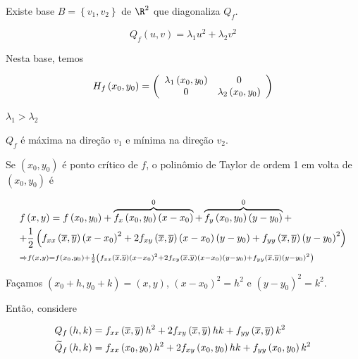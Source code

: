 \documentclass[11pt, oneside, a4paper]{gsm-l}
\begin{document}
Existe base $B = \left\{ {v_1 ,v_2 } \right\}$ de $\R^2$ que diagonaliza $Q_f$.

\[
Q_f \left( {u,v} \right) = \lambda _1 u^2  + \lambda _2 v^2
\]

Nesta base, temos

\[
H_f \left( {x_0 ,y_0 } \right) = \left( {\begin{array}{*{20}c}
{\lambda _1 \left( {x_0 ,y_0 } \right)} & 0  \\
0 & {\lambda _2 \left( {x_0 ,y_0 } \right)}  \\

\end{array} } \right)
\]

$\lambda_1 > \lambda_2$

$Q_f$ é máxima na direção $v_1$ e mínima na direção $v_2$.


Se $\left( {x_0 ,y_0 } \right)$ é ponto crítico de $f$, o polin\^omio de Taylor de ordem 1 em volta de $\left( {x_0 ,y_0 } \right)$ é

\[
\begin{gathered}
  f\left( {x,y} \right) = f\left( {x_0 ,y_0 } \right) + \overbrace {f_x \left( {x_0 ,y_0 } \right)\left( {x - x_0 } \right)}^0 + \overbrace {f_y \left( {x_0 ,y_0 } \right)\left( {y - y_0 } \right)}^0 +  \hfill \\
+ \frac{1}
{2}\left( {f_{xx} \left( {\overline x ,\overline y } \right)\left( {x - x_0 } \right)^2  + 2f_{xy} \left( {\overline x ,\overline y } \right)\left( {x - x_0 } \right)\left( {y - y_0 } \right) + f_{yy} \left( {\overline x ,\overline y } \right)\left( {y - y_0 } \right)^2 } \right) \hfill \\ 
\scriptstyle{ \Rightarrow f\left( {x,y} \right) = f\left( {x_0 ,y_0 } \right) + \frac{1}
{2}\left( {f_{xx} \left( {\overline x ,\overline y } \right)\left( {x - x_0 } \right)^2  + 2f_{xy} \left( {\overline x ,\overline y } \right)\left( {x - x_0 } \right)\left( {y - y_0 } \right) + f_{yy} \left( {\overline x ,\overline y } \right)\left( {y - y_0 } \right)^2 } \right)} \hfill \\
\end{gathered}
\]

Façamos $\left( {x_0  + h,y_0  + k} \right) = \left( {x,y} \right)$, $\left( {x - x_0 } \right)^2  = h^2$ e $\left( {y - y_0 } \right)^2  = k^2$.

Então, considere

\[
\begin{gathered}
  Q_f \left( {h,k} \right) = f_{xx} \left( {\overline x ,\overline y } \right)h^2  + 2f_{xy} \left( {\overline x ,\overline y } \right)hk + f_{yy} \left( {\overline x ,\overline y } \right)k^2  \hfill \\
  \widetilde Q_f \left( {h,k} \right) = f_{xx} \left( {x_0 ,y_0 } \right)h^2  + 2f_{xy} \left( {x_0 ,y_0 } \right)hk + f_{yy} \left( {x_0 ,y_0 } \right)k^2  \hfill \\
\end{gathered}
\]
\end{document}
